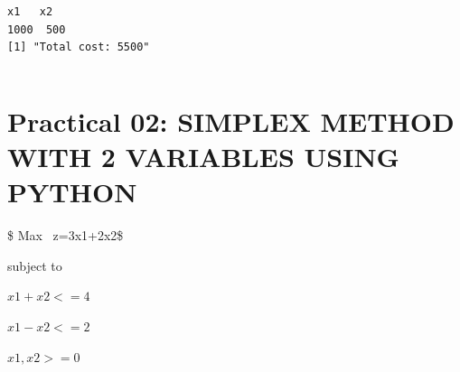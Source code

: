 \documentclass[11pt]{article}
\makeatletter
\newcommand{\boxspacing}{\kern\kvtcb@left@rule\kern\kvtcb@boxsep}
\newcommand{\prompt}[4]{
        {\ttfamily\llap{{\color{#2}[#3]:\hspace{3pt}#4}}\vspace{-\baselineskip}}
    }
\makeatother
\begin{document}
    \begin{Verbatim}[commandchars=\\\{\}]
  x1   x2
1000  500
[1] "Total cost: 5500"
    \end{Verbatim}

    \begin{tcolorbox}[breakable, size=fbox, boxrule=1pt, pad at break*=1mm,colback=cellbackground, colframe=cellborder]
\prompt{In}{incolor}{ }{\boxspacing}
\begin{Verbatim}[commandchars=\\\{\}]

\end{Verbatim}
\end{tcolorbox}

    \section{Practical 02: \uppercase{Simplex Method with 2 variables using
Python}}\label{practical-02-simplex-method-with-2-variables-using-python}

\$ Max ~z=3x1+2x2\$

subject to

\(x1 + x2 <=4\)

\(x1 - x2 <=2\)

\(x1,x2>=0\)
\end{document}
